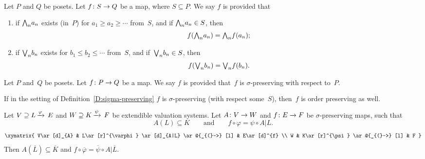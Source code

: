 %
%
\begin{dfn}
\label{D:sigma-preserving}
Let $P$ and $Q$ be posets.
Let $f\colon S\rightarrow Q$ be a map, where $S\subseteq P$.
We say $f$ is 
provided that
\begin{enumerate}
\item
if 
$\textstyle{\bigwedge}_n{a_n}$ exists
(in~$P$)
for
$a_1 \geq a_2 \geq \dotsb$
from~$S$,
and if $\textstyle{\bigwedge}_n a_n\in S$,
then 
\begin{equation*}
f(\textstyle{\bigwedge}_n a_n) = \textstyle{\bigwedge}_n f(a_n);
\end{equation*}

\item
if 
$\textstyle{\bigvee}_n{b_n}$ exists
for
$b_1 \leq b_2 \leq \dotsb$
from~$S$,
and if~$\textstyle{\bigvee}_n b_n\in S$,
then 
\begin{equation*}
f(\textstyle{\bigvee}_n b_n) = \textstyle{\bigvee}_n f(b_n).
\end{equation*}
\end{enumerate}
Let $P$ and~$Q$ be posets. Let $f\colon P \rightarrow Q$ be a map.
We say $f$ is 
provided that~$f$ is $\sigma$-preserving with respect to~$P$.
\end{dfn}
\begin{rem}
If in the setting of Definition~\ref{D:sigma-preserving}
$f$ is $\sigma$-preserving
(with respect some~$S$),
then~$f$ is order preserving as well.
\end{rem}
%
%
\begin{thm}
\label{T:ext1}
Let $V \supseteq L\,\smash{\xrightarrow{\varphi}\,E}$ and
 $W \supseteq K\,\smash{\xrightarrow{\psi}\,F}$ be extendible valuation systems.
Let
$A\colon V\rightarrow W$
and 
$f\colon E\rightarrow F$ be $\sigma$-preserving maps,
such that 
\begin{equation*}
A(L)\subseteq K
\qquad\text{and}\qquad
f \circ \varphi = \psi \circ A|L.
\end{equation*}
\begin{equation*}
\xymatrix{
V\ar[d]_{A} & 
  L\ar[r]^{\varphi} \ar[d]_{A|L} \ar @{_{(}->} [l] & 
  E\ar[d]^{f} \\
W &
  K\ar[r]^{\psi} \ar @{_{(}->} [l] & 
  F
}\end{equation*}
Then $A(\overline{L})\subseteq \overline{K}$
and $f \circ \overline\varphi = \overline\psi\circ A|\overline L$.
\end{thm}
